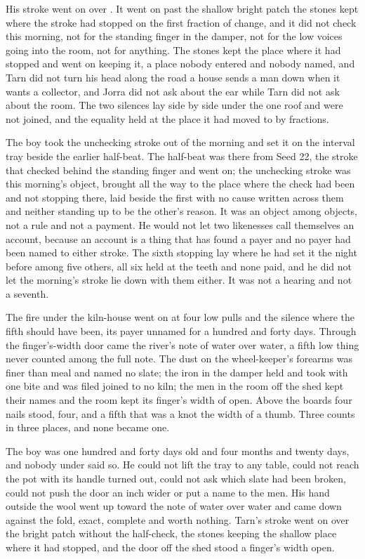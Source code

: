 His stroke went on over . It went on past the shallow bright patch the stones kept where the stroke had stopped on the first fraction of change, and it did not check this morning, not for the standing finger in the damper, not for the low voices going into the room, not for anything. The stones kept the place where it had stopped and went on keeping it, a place nobody entered and nobody named, and Tarn did not turn his head along the road a house sends a man down when it wants a collector, and Jorra did not ask about the ear while Tarn did not ask about the room. The two silences lay side by side under the one roof and were not joined, and the equality held at the place it had moved to by fractions.

The boy took the unchecking stroke out of the morning and set it on the interval tray beside the earlier half-beat. The half-beat was there from Seed 22, the stroke that checked behind the standing finger and went on; the unchecking stroke was this morning's object, brought all the way to the place where the check had been and not stopping there, laid beside the first with no cause written across them and neither standing up to be the other's reason. It was an object among objects, not a rule and not a payment. He would not let two likenesses call themselves an account, because an account is a thing that has found a payer and no payer had been named to either stroke. The sixth stopping lay where he had set it the night before among five others, all six held at the teeth and none paid, and he did not let the morning's stroke lie down with them either. It was not a hearing and not a seventh.

The fire under the kiln-house went on at four low pulls and the silence where the fifth should have been, its payer unnamed for a hundred and forty days. Through the finger's-width door came the river's note of water over water, a fifth low thing never counted among the full note. The dust on the wheel-keeper's forearms was finer than meal and named no slate; the iron in the damper held and took with one bite and was filed joined to no kiln; the men in the room off the shed kept their names and the room kept its finger's width of open. Above the boards four nails stood, four, and a fifth that was a knot the width of a thumb. Three counts in three places, and none became one.

The boy was one hundred and forty days old and four months and twenty days, and nobody under  said so. He could not lift the tray to any table, could not reach the pot with its handle turned out, could not ask which slate had been broken, could not push the door an inch wider or put a name to the men. His hand outside the wool went up toward the note of water over water and came down against the fold, exact, complete and worth nothing. Tarn's stroke went on over the bright patch without the half-check, the stones keeping the shallow place where it had stopped, and the door off the shed stood a finger's width open.
